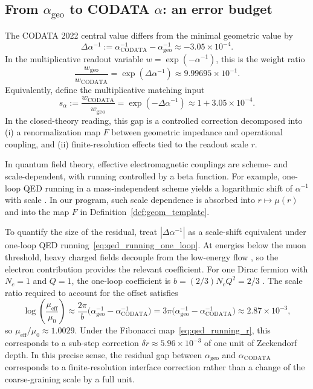 \subsection{From \texorpdfstring{$\alpha_{\mathrm{geo}}$}{alpha\_geo} to CODATA \texorpdfstring{$\alpha$}{alpha}: an error budget}
The CODATA 2022 central value differs from the minimal geometric value by
\begin{equation}
\Delta\alpha^{-1}:=\alpha_{\mathrm{CODATA}}^{-1}-\alpha_{\mathrm{geo}}^{-1}\approx -3.05\times 10^{-4}.
\end{equation}
In the multiplicative readout variable $w=\exp(-\alpha^{-1})$, this is the weight ratio
\begin{equation}
\frac{w_{\mathrm{geo}}}{w_{\mathrm{CODATA}}}
=\exp(\Delta\alpha^{-1})
\approx 9.99695\times 10^{-1}.
\end{equation}
Equivalently, define the multiplicative matching input
\begin{equation}
s_\alpha:=\frac{w_{\mathrm{CODATA}}}{w_{\mathrm{geo}}}=\exp(-\Delta\alpha^{-1})\approx 1+3.05\times 10^{-4}.
\end{equation}
In the closed-theory reading, this gap is a controlled correction decomposed into (i) a renormalization map $F$ between geometric impedance and operational coupling, and (ii) finite-resolution effects tied to the readout scale $r$.

In quantum field theory, effective electromagnetic couplings are scheme- and scale-dependent, with running controlled by a beta function. For example, one-loop QED running in a mass-independent scheme yields a logarithmic shift of $\alpha^{-1}$ with scale \cite{PeskinSchroeder1995,GellMannLow1954}. In our program, such scale dependence is absorbed into $r\mapsto \mu(r)$ and into the map $F$ in Definition~\ref{def:geom_template}.

To quantify the size of the residual, treat $|\Delta\alpha^{-1}|$ as a scale-shift equivalent under one-loop QED running~\eqref{eq:qed_running_one_loop}. At energies below the muon threshold, heavy charged fields decouple from the low-energy flow \cite{AppelquistCarazzone1975}, so the electron contribution provides the relevant coefficient. For one Dirac fermion with $N_c=1$ and $Q=1$, the one-loop coefficient is $b=(2/3)N_cQ^2=2/3$ \cite{PeskinSchroeder1995}. The scale ratio required to account for the offset satisfies
\begin{equation}
\log\!\left(\frac{\mu_{\mathrm{eff}}}{\mu_0}\right)
\approx
\frac{2\pi}{b}\big(\alpha_{\mathrm{geo}}^{-1}-\alpha_{\mathrm{CODATA}}^{-1}\big)
=3\pi\big(\alpha_{\mathrm{geo}}^{-1}-\alpha_{\mathrm{CODATA}}^{-1}\big)
\approx 2.87\times 10^{-3},
\end{equation}
so $\mu_{\mathrm{eff}}/\mu_0\approx 1.0029$. Under the Fibonacci map~\eqref{eq:qed_running_r}, this corresponds to a sub-step correction $\delta r\approx 5.96\times 10^{-3}$ of one unit of Zeckendorf depth. In this precise sense, the residual gap between $\alpha_{\mathrm{geo}}$ and $\alpha_{\mathrm{CODATA}}$ corresponds to a finite-resolution interface correction rather than a change of the coarse-graining scale by a full unit.

